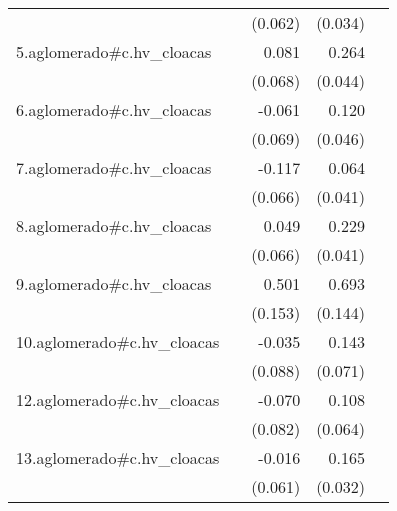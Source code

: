 {\begin{longtable}{l*{4}{D{.}{.}{-1}}}
            &                     &     (0.062)         &     (0.034)         &                     \\
\addlinespace
5.aglomerado#c.hv\_cloacas&                     &       0.081         &       0.264\sym{***}&                     \\
            &                     &     (0.068)         &     (0.044)         &                     \\
\addlinespace
6.aglomerado#c.hv\_cloacas&                     &      -0.061         &       0.120\sym{**} &                     \\
            &                     &     (0.069)         &     (0.046)         &                     \\
\addlinespace
7.aglomerado#c.hv\_cloacas&                     &      -0.117         &       0.064         &                     \\
            &                     &     (0.066)         &     (0.041)         &                     \\
\addlinespace
8.aglomerado#c.hv\_cloacas&                     &       0.049         &       0.229\sym{***}&                     \\
            &                     &     (0.066)         &     (0.041)         &                     \\
\addlinespace
9.aglomerado#c.hv\_cloacas&                     &       0.501\sym{**} &       0.693\sym{***}&                     \\
            &                     &     (0.153)         &     (0.144)         &                     \\
\addlinespace
10.aglomerado#c.hv\_cloacas&                     &      -0.035         &       0.143\sym{*}  &                     \\
            &                     &     (0.088)         &     (0.071)         &                     \\
\addlinespace
12.aglomerado#c.hv\_cloacas&                     &      -0.070         &       0.108         &                     \\
            &                     &     (0.082)         &     (0.064)         &                     \\
\addlinespace
13.aglomerado#c.hv\_cloacas&                     &      -0.016         &       0.165\sym{***}&                     \\
            &                     &     (0.061)         &     (0.032)         &                     \\

\end{longtable}}

